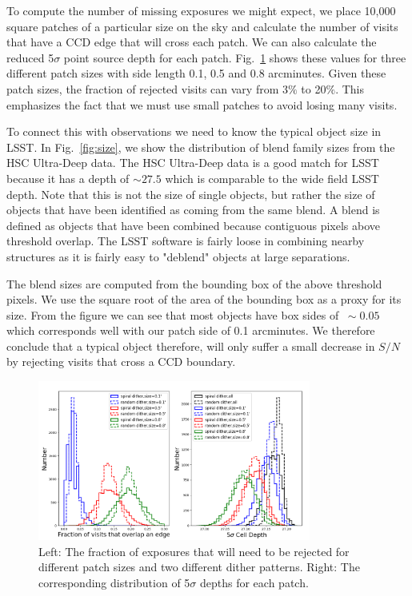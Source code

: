 \documentclass[fleqn,useAMS,usenatbib]{mnras}
\begin{document}
To compute the number of missing exposures we might expect, we place 10,000 square patches of a particular size on the sky and calculate the number of visits that have a CCD edge that will cross each patch.  We can also calculate the reduced 5$\sigma$ point source depth for each patch.  Fig.~\ref{fig:dither} shows these values for three different patch sizes with side length 0.1, 0.5 and 0.8 arcminutes. Given these patch sizes, the fraction of rejected visits can vary from 3$\%$ to 20$\%$.  This emphasizes the fact that we must use small patches to avoid losing many visits.  

To connect this with observations we need to know the typical object size in LSST.  In Fig.~\ref{fig:size}, we show the distribution of blend family sizes from the HSC Ultra-Deep\citep{SurveyOverview} data.  The HSC Ultra-Deep data is a good match for LSST because it has a depth of $\sim27.5$ which is comparable to the wide field LSST depth.  Note that this is not the size of single objects, but rather the size of objects that have been identified as coming from the same blend.  A blend is defined as objects that have been combined because contiguous pixels above threshold overlap.  The LSST software is fairly loose in combining nearby structures as it is fairly easy to "deblend" objects at large separations.  

The blend sizes are computed from the bounding box of the above threshold pixels.  We use the square root of the area of the bounding box as a proxy for its size.  From the figure we can see that most objects have box sides of $~\sim 0.05$ which corresponds well with our patch side of 0.1 arcminutes.  We therefore conclude that a typical object therefore, will only suffer a small decrease in $S/N$ by rejecting visits that cross a CCD boundary.


\begin{figure}
    \includegraphics[width=0.8\textwidth]{cell.png}
    \caption{
    Left: The fraction of exposures that will need to be rejected for different patch sizes and two different dither patterns.  Right:  The corresponding distribution of 5$\sigma$ depths for each patch.
    }
    \label{fig:dither}
\end{figure}
\end{document}
